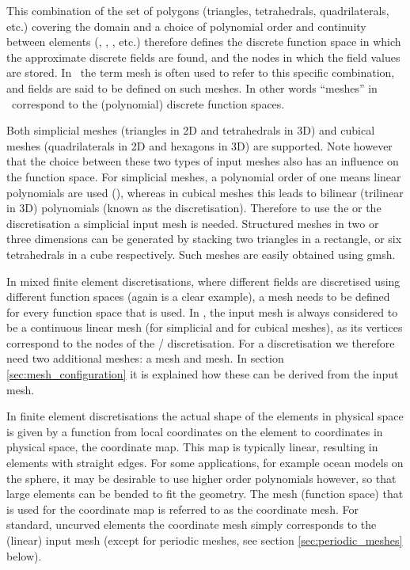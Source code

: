 This combination of the set of polygons (triangles, tetrahedrals, 
quadrilaterals, etc.) covering the domain 
and a choice of polynomial order and continuity between
elements (\Pone, \PoDG, \Ptwo, etc.) therefore defines the discrete function 
space in which the approximate discrete fields are found, and the nodes
in which the field values are stored. In \fluidity\ 
the term mesh is often used to refer to this specific combination, and fields are said
to be defined on such meshes. In other words ``meshes'' in \fluidity\ correspond
to the (polynomial) discrete function spaces.

Both simplicial meshes (triangles in 2D and tetrahedrals in 3D) and cubical
meshes (quadrilaterals in 2D and hexagons in 3D) are supported. Note however
that the choice between these two types of input meshes also has an influence
on the function space. For simplicial meshes, a polynomial order
of one means linear polynomials are used (\Pone), whereas in cubical meshes this
leads to bilinear (trilinear in 3D) polynomials (known as the \Qone
discretisation). Therefore to use 
the \Poo or the \PoDGPt discretisation 
a simplicial input mesh is needed. Structured meshes in two
or three dimensions can be generated by stacking two triangles in a rectangle,
or six tetrahedrals in a cube respectively. Such meshes are easily obtained
using gmsh.

In mixed finite element discretisations, where different fields are discretised
using different function spaces (again \PoDGPt is a clear example), a mesh needs
to be defined for every function space that is used. In \fluidity, 
the input mesh is always considered to be a 
continuous linear mesh (\Pone for simplicial and \Qone for
cubical meshes), as its vertices correspond to the nodes of the \Pone/\Qone
discretisation. For a \PoDGPt discretisation we therefore need two additional
meshes: a \PoDG mesh and \Ptwo mesh. In section \ref{sec:mesh_configuration} it
is explained how these can be derived from the input mesh.

In finite element discretisations the actual shape of the elements in physical
space is given by a function from local coordinates on the element to
coordinates in physical space, the coordinate map. This map is typically linear,
resulting in elements with straight edges. For some applications, for example
ocean models on the sphere, it may be desirable to use higher order
polynomials however, so that large elements can be bended to fit the
geometry. The mesh (function space) that is used for the coordinate map is
referred to as the coordinate mesh. For standard, uncurved elements 
the coordinate mesh simply corresponds to the (linear) input mesh
(except for periodic meshes, see section \ref{sec:periodic_meshes} below).

